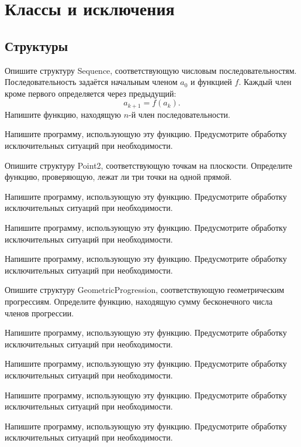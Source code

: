 \section{Классы и исключения}

\subsection{Структуры}

\task Опишите структуру Sequence, соответствующую числовым
последовательностям. Последовательность задаётся начальным членом
$a_0$ и функцией $f$. Каждый член кроме первого определяется через
предыдущий:
\[
a_{k+1} = f(a_k).
\]
Напишите функцию, находящую $n$-й член последовательности.

Напишите программу, использующую эту функцию. Предусмотрите обработку
исключительных ситуаций при необходимости.

\task Опишите структуру Point2, соответствующую точкам на
плоскости. Определите функцию, проверяющую, лежат ли три точки на
одной прямой.

Напишите программу, использующую эту функцию. Предусмотрите обработку
исключительных ситуаций при необходимости.

\task %

Напишите программу, использующую эту функцию. Предусмотрите обработку
исключительных ситуаций при необходимости.

\task %

Напишите программу, использующую эту функцию. Предусмотрите обработку
исключительных ситуаций при необходимости.

\task Опишите структуру GeometricProgression, соответствующую
геометрическим прогрессиям. Определите функцию, находящую сумму
бесконечного числа членов прогрессии.

Напишите программу, использующую эту функцию. Предусмотрите обработку
исключительных ситуаций при необходимости.

\task %

Напишите программу, использующую эту функцию. Предусмотрите обработку
исключительных ситуаций при необходимости.

\task %

Напишите программу, использующую эту функцию. Предусмотрите обработку
исключительных ситуаций при необходимости.

\task %

Напишите программу, использующую эту функцию. Предусмотрите обработку
исключительных ситуаций при необходимости.

